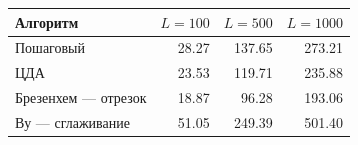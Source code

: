 \begin{tabular}{lrrr}\toprule
Алгоритм & $L=100$ & $L=500$ & $L=1000$\\\midrule
Пошаговый & 28.27 & 137.65 & 273.21\\
ЦДА & 23.53 & 119.71 & 235.88\\
Брезенхем — отрезок & 18.87 & 96.28 & 193.06\\
Ву — сглаживание & 51.05 & 249.39 & 501.40\\
\bottomrule\end{tabular}
